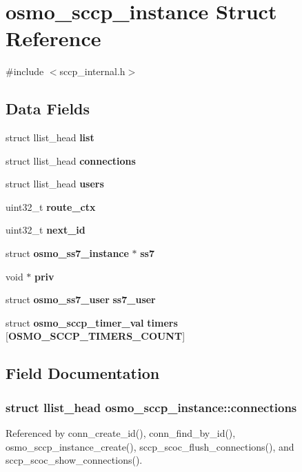 \section{osmo\+\_\+sccp\+\_\+instance Struct Reference}
\label{structosmo__sccp__instance}


{\ttfamily \#include $<$sccp\+\_\+internal.\+h$>$}

\subsection*{Data Fields}
\begin{DoxyCompactItemize}
\item 
struct llist\+\_\+head {\bf list}
\item 
struct llist\+\_\+head {\bf connections}
\item 
struct llist\+\_\+head {\bf users}
\item 
uint32\+\_\+t {\bf route\+\_\+ctx}
\item 
uint32\+\_\+t {\bf next\+\_\+id}
\item 
struct {\bf osmo\+\_\+ss7\+\_\+instance} $\ast$ {\bf ss7}
\item 
void $\ast$ {\bf priv}
\item 
struct {\bf osmo\+\_\+ss7\+\_\+user} {\bf ss7\+\_\+user}
\item 
struct {\bf osmo\+\_\+sccp\+\_\+timer\+\_\+val} {\bf timers} [{\bf O\+S\+M\+O\+\_\+\+S\+C\+C\+P\+\_\+\+T\+I\+M\+E\+R\+S\+\_\+\+C\+O\+U\+NT}]
\end{DoxyCompactItemize}


\subsection{Field Documentation}
\subsubsection[{connections}]{\setlength{\rightskip}{0pt plus 5cm}struct llist\+\_\+head osmo\+\_\+sccp\+\_\+instance\+::connections}\label{structosmo__sccp__instance_a09865284d107aa16445eadcf5f19f3c4}


Referenced by conn\+\_\+create\+\_\+id(), conn\+\_\+find\+\_\+by\+\_\+id(), osmo\+\_\+sccp\+\_\+instance\+\_\+create(), sccp\+\_\+scoc\+\_\+flush\+\_\+connections(), and sccp\+\_\+scoc\+\_\+show\+\_\+connections().

